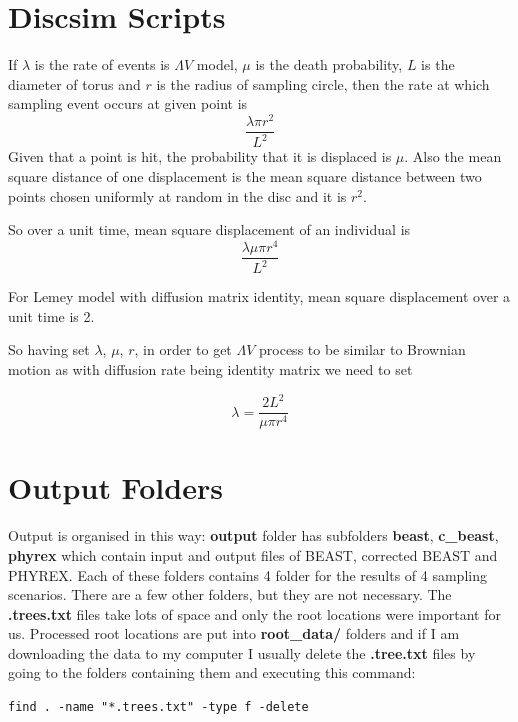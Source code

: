 \section*{Discsim Scripts}

If $\lambda$ is the rate of events is $\Lambda V$ model, $\mu$ is the death probability, $L$ is the diameter of torus and $r$ is the radius of sampling circle, then the rate at which sampling event occurs at given point is
$$\frac{\lambda \pi r^2}{L^2}$$
Given that a point is hit, the probability that it is displaced is $\mu$. Also the mean square distance of one displacement is the mean square distance between two points chosen uniformly at random in the disc and it is $r^2$.

So over a unit time, mean square displacement of an individual is
$$\frac{\lambda \mu \pi r^4}{L^2}$$

For Lemey model with diffusion matrix identity, mean square displacement over a unit time is 2. 

So having set $\lambda$, $\mu$, $r$, in order to get $\Lambda V$ process to be similar to Brownian motion as with diffusion rate being identity matrix we need to set

$$\lambda=\frac{2L^2}{\mu \pi r^4}$$








\section*{Output Folders}
Output is organised in this way: \textbf{output} folder has subfolders 
\textbf{beast}, \textbf{c\_beast}, \textbf{phyrex} which contain input and output files of BEAST, corrected BEAST and PHYREX. Each of these folders contains 4 folder for the results of 4 sampling scenarios. There are a few other folders, but they are not necessary.
The \textbf{.trees.txt} files take lots of space and only the root locations were important for us. Processed root locations are put into \textbf{root\_data/} folders and if I am downloading the data to my computer I usually delete the \textbf{.tree.txt} files by going to the folders containing them and executing this command:

\begin{verbatim}
find . -name "*.trees.txt" -type f -delete
\end{verbatim} 


